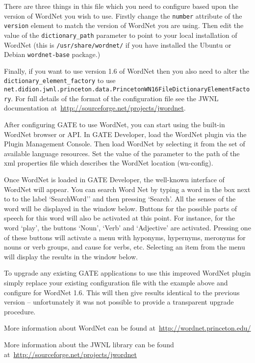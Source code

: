 There are three things in this file which you need to configure based upon the
version of WordNet you wish to use.  Firstly change the \verb|number| attribute
of the \verb|version| element to match the version of WordNet you are using.
Then edit the value of the \verb|dictionary_path| parameter to point to your
local installation of WordNet (this is \verb!/usr/share/wordnet/! if you have
installed the Ubuntu or Debian \texttt{wordnet-base} package.)


Finally, if you want to use version 1.6 of WordNet then you also need to alter
the \verb|dictionary_element_factory| to use
\verb|net.didion.jwnl.princeton.data.PrincetonWN16FileDictionaryElementFactory|. For
full details of the format of the configuration file see the JWNL documentation
at~\url{http://sourceforge.net/projects/jwordnet}.

After configuring GATE to use WordNet, you can start using the
built-in WordNet browser or API. In GATE Developer, load the WordNet
plugin via the Plugin Management Console. Then load WordNet by selecting it from
the set of available language resources. Set the value of the
parameter to the path of the xml properties file which describes the
WordNet location (wn-config).

Once WordNet is loaded in GATE Developer, the well-known interface of
WordNet will appear. You can search Word Net by typing a word in the
box next to to the label `SearchWord'' and then pressing
`Search'. All the senses of the word will be displayed in the window
below.  Buttons for the possible parts of speech for this word will
also be activated at this point.  For instance, for the word `play',
the buttons `Noun', `Verb' and `Adjective' are activated.
Pressing one of these buttons will activate a menu with hyponyms,
hypernyms, meronyms for nouns or verb groups, and cause for verbs,
etc. Selecting an item from the menu will display the results in the
window below.

To upgrade any existing GATE applications to use this improved WordNet plugin simply replace your
existing configuration file with the example above and configure for WordNet 1.6. This will then
give results identical to the previous version -- unfortunately it was not possible to provide
a transparent upgrade procedure.

More information about WordNet can be found
at~\url{http://wordnet.princeton.edu/}

More information about the JWNL library can be found
at~\url{http://sourceforge.net/projects/jwordnet}

